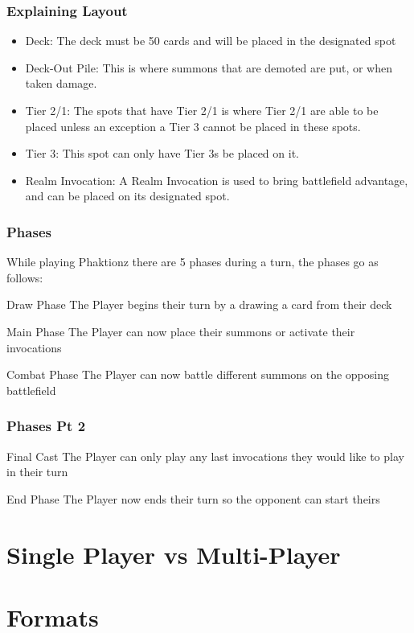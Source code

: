 \documentclass{beamer}
\begin{document}
\begin{frame}
    \frametitle{Explaining Layout}
\begin{itemize}
    \item Deck: The deck must be 50 cards and will be placed in the designated spot 
    \item Deck-Out Pile: This is where summons that are demoted are put, or when taken damage. 
    \item Tier 2/1: The spots that have Tier 2/1 is where Tier 2/1 are able to be placed unless an exception a Tier 3 cannot be placed in these spots. 
    \item Tier 3: This spot can only have Tier 3s be placed on it. 
    \item Realm Invocation: A Realm Invocation is used to bring battlefield advantage, and can be placed on its designated spot. 
\end{itemize}
    

\end{frame}



\begin{frame}
    \frametitle{Phases}
    \textrm{While playing Phaktionz there are 5 phases during a turn, the phases go as follows:} 
    \begin{alertblock}{Draw Phase}
        \textrm{The Player begins their turn by a drawing a card from their deck}
    \end{alertblock}
    \begin{alertblock}{Main Phase}
       \textrm{The Player can now place their summons or activate their invocations}
    \end{alertblock}
    \begin{alertblock}{Combat Phase}
        \textrm{The Player can now battle different summons on the opposing battlefield}
    \end{alertblock}
\end{frame}
%
\begin{frame}
    \frametitle{Phases Pt 2}
    \begin{alertblock}{Final Cast}
        \textrm{The Player can only play any last invocations they would like to play in their turn}
    \end{alertblock}
    \begin{alertblock}{End Phase}
        \textrm{The Player now ends their turn so the opponent can start theirs}
    \end{alertblock}
\end{frame}




\section{Single Player vs Multi-Player}





\section{Formats}
\end{document}
